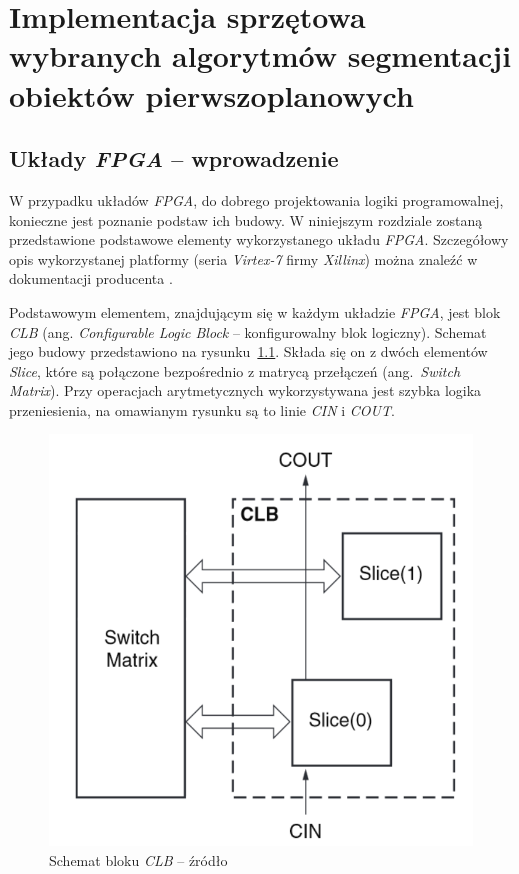 \chapter{Implementacja sprzętowa wybranych algorytmów segmentacji obiektów pierwszoplanowych}
\label{cha:implementacja_sprzetowa}

\section{Układy \textit{FPGA} -- wprowadzenie}
\label{sec:fpga_wprowadzenie}

W przypadku układów \textit{FPGA}, do dobrego projektowania logiki programowalnej, konieczne jest poznanie podstaw ich budowy. 
W niniejszym rozdziale zostaną przedstawione podstawowe elementy wykorzystanego układu \textit{FPGA}. 
Szczegółowy opis wykorzystanej platformy (seria \textit{Virtex-7} firmy \textit{Xillinx}) można znaleźć w dokumentacji producenta \cite{xilinx_v7}.

Podstawowym elementem, znajdującym się w każdym układzie \textit{FPGA}, jest blok \textit{CLB} (ang. \textit{Configurable Logic Block} -- konfigurowalny blok logiczny). 
Schemat jego budowy przedstawiono na rysunku~\ref{fig:fpga_clb}. 
Składa się on z dwóch elementów \textit{Slice}, które są połączone bezpośrednio z matrycą przełączeń (ang.~\textit{Switch Matrix}). 
Przy operacjach arytmetycznych wykorzystywana jest szybka logika przeniesienia, na omawianym rysunku są to linie \textit{CIN} i \textit{COUT}.
 
    \begin{figure}[h!]
        \centering
        \includegraphics[scale=0.35]{img/4/clb_block.png}
        \caption{Schemat bloku \textit{CLB} -- źródło \cite{xilinx_v7}}
	    \label{fig:fpga_clb}
    \end{figure}

